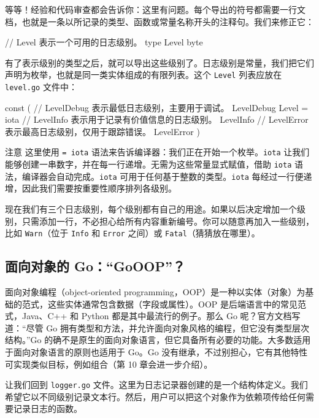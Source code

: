 等等！经验和代码审查都会告诉你：这里有问题。每个导出的符号都需要一行文档，也就是一条以所记录的类型、函数或常量名称开头的注释句。我们来修正它：

\begin{gocode}[]
// Level 表示一个可用的日志级别。
type Level byte
\end{gocode}

有了表示级别的类型之后，就可以导出这些级别了。日志级别是常量，我们把它们声明为枚举，也就是同一类实体组成的有限列表。这个 \texttt{Level} 列表应放在 \texttt{level.go} 文件中：

\begin{gocode}[]
const (
    // LevelDebug 表示最低日志级别，主要用于调试。
    LevelDebug Level = iota
    // LevelInfo 表示用于记录有价值信息的日志级别。
    LevelInfo
    // LevelError 表示最高日志级别，仅用于跟踪错误。
    LevelError
)
\end{gocode}

\begin{infobox}{注意}
这里使用 \texttt{= iota} 语法来告诉编译器：我们正在开始一个枚举。\texttt{iota} 让我们能够创建一串数字，并在每一行递增。无需为这些常量显式赋值，借助 \texttt{iota} 语法，编译器会自动完成。\texttt{iota} 可用于任何基于整数的类型。\texttt{iota} 每经过一行便递增，因此我们需要按重要性顺序排列各级别。
\end{infobox}

现在我们有三个日志级别，每个级别都有自己的用途。如果以后决定增加一个级别，只需添加一行，不必担心给所有内容重新编号。你可以随意再加入一些级别，比如 \texttt{Warn}（位于 \texttt{Info} 和 \texttt{Error} 之间）或 \texttt{Fatal}（猜猜放在哪里）。

\subsection{面向对象的 Go：“GoOOP”？}

面向对象编程（object-oriented programming，OOP）是一种以实体（对象）为基础的范式，这些实体通常包含数据（字段或属性）。OOP 是后端语言中的常见范式，Java、C++ 和 Python 都是其中最流行的例子。那么 Go 呢？官方文档写道：“尽管 Go 拥有类型和方法，并允许面向对象风格的编程，但它没有类型层次结构。”Go 的确不是原生的面向对象语言，但它具备所有必要的功能。大多数适用于面向对象语言的原则也适用于 Go。Go 没有继承，不过别担心，它有其他特性可实现类似目标，例如组合（第 10 章会进一步介绍）。

让我们回到 \texttt{logger.go} 文件。这里为日志记录器创建的是一个结构体定义。我们希望它以不同级别记录文本行。然后，用户可以把这个对象作为依赖项传给任何需要记录日志的函数。

